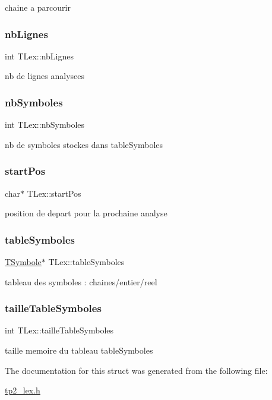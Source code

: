 chaine a parcourir \mbox{\label{structTLex_a74499b75b25dc1bce1fb2f66af6ce1e2}} 
\subsubsection{\texorpdfstring{nb\+Lignes}{nbLignes}}
{\footnotesize\ttfamily int T\+Lex\+::nb\+Lignes}

nb de lignes analysees \mbox{\label{structTLex_a84d0d3a30f4b42f8db675f8cbb60373f}} 
\subsubsection{\texorpdfstring{nb\+Symboles}{nbSymboles}}
{\footnotesize\ttfamily int T\+Lex\+::nb\+Symboles}

nb de symboles stockes dans table\+Symboles \mbox{\label{structTLex_a1122e1ced17c2c07f7975b4f11110ad8}} 
\subsubsection{\texorpdfstring{start\+Pos}{startPos}}
{\footnotesize\ttfamily char$\ast$ T\+Lex\+::start\+Pos}

position de depart pour la prochaine analyse \mbox{\label{structTLex_a31a6c4fc0839643e3251a372ba7adf04}} 
\subsubsection{\texorpdfstring{table\+Symboles}{tableSymboles}}
{\footnotesize\ttfamily \hyperlink{structTSymbole}{T\+Symbole}$\ast$ T\+Lex\+::table\+Symboles}

tableau des symboles \+: chaines/entier/reel \mbox{\label{structTLex_abb50eca8f47fc2c73983a5909967e362}} 
\subsubsection{\texorpdfstring{taille\+Table\+Symboles}{tailleTableSymboles}}
{\footnotesize\ttfamily int T\+Lex\+::taille\+Table\+Symboles}

taille memoire du tableau table\+Symboles 

The documentation for this struct was generated from the following file\+:\begin{DoxyCompactItemize}
\item 
\hyperlink{tp2__lex_8h}{tp2\+\_\+lex.\+h}\end{DoxyCompactItemize}
